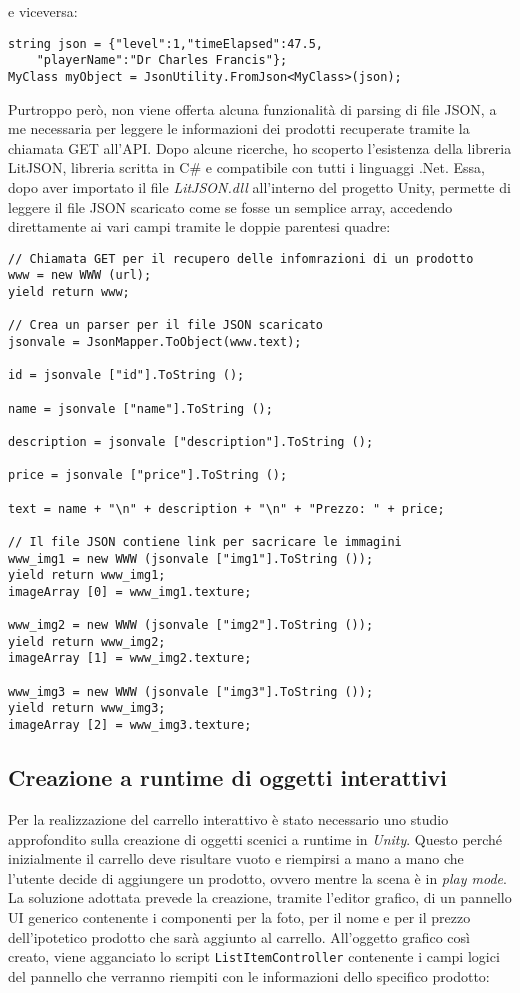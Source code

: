 e viceversa:

\begin{lstlisting}[style=MyCStyle]
string json = {"level":1,"timeElapsed":47.5,
	"playerName":"Dr Charles Francis"};
MyClass myObject = JsonUtility.FromJson<MyClass>(json);
\end{lstlisting}

Purtroppo però, non viene offerta alcuna funzionalità di parsing di file JSON, a me necessaria per leggere le informazioni dei prodotti recuperate tramite la chiamata GET all'API. Dopo alcune ricerche, ho scoperto l'esistenza della libreria LitJSON, libreria scritta in C\# e compatibile con tutti i linguaggi .Net. Essa, dopo aver importato il file \textit{LitJSON.dll} all'interno del progetto Unity, permette di leggere il file JSON scaricato come se fosse un semplice array, accedendo direttamente ai vari campi tramite le doppie parentesi quadre:

\begin{lstlisting}[style=MyCStyle]
// Chiamata GET per il recupero delle infomrazioni di un prodotto
www = new WWW (url);
yield return www;

// Crea un parser per il file JSON scaricato
jsonvale = JsonMapper.ToObject(www.text);

id = jsonvale ["id"].ToString ();

name = jsonvale ["name"].ToString ();

description = jsonvale ["description"].ToString ();

price = jsonvale ["price"].ToString ();

text = name + "\n" + description + "\n" + "Prezzo: " + price;

// Il file JSON contiene link per sacricare le immagini
www_img1 = new WWW (jsonvale ["img1"].ToString ());
yield return www_img1;
imageArray [0] = www_img1.texture;

www_img2 = new WWW (jsonvale ["img2"].ToString ());
yield return www_img2;
imageArray [1] = www_img2.texture;

www_img3 = new WWW (jsonvale ["img3"].ToString ());
yield return www_img3;
imageArray [2] = www_img3.texture;
\end{lstlisting}

\subsection{Creazione a runtime di oggetti interattivi}

Per la realizzazione del carrello interattivo è stato necessario uno studio approfondito sulla creazione di oggetti scenici a runtime in \textit{Unity}. Questo perché inizialmente il carrello deve risultare vuoto e riempirsi a mano a mano che l'utente decide di aggiungere un prodotto, ovvero mentre la scena è in \textit{play mode}. \\ 
La soluzione adottata prevede la creazione, tramite l'editor grafico, di un pannello UI generico contenente i componenti per la foto, per il nome e per il prezzo dell'ipotetico prodotto che sarà aggiunto al carrello. All'oggetto grafico così creato, viene agganciato lo script \texttt{ListItemController} contenente i campi logici del pannello che verranno riempiti con le informazioni dello specifico prodotto: 


